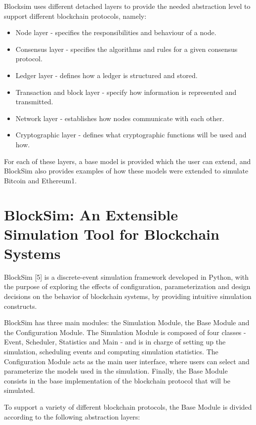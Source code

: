 Blocksim uses different detached layers to provide the needed abstraction level to support different blockchain protocols, namely:

\begin{itemize}
	\item Node layer - specifies the responsibilities and behaviour of a node.
	\item Consensus layer - specifies the algorithms and rules for a given consensus protocol.
	\item Ledger layer - defines how a ledger is structured and stored.
	\item Transaction and block layer - specify how information is represented and transmitted.
	\item Network layer - establishes how nodes communicate with each other.
	\item Cryptographic layer - defines what cryptographic functions will be used and how.
\end{itemize}

For each of these layers, a base model is provided which the user can extend, and BlockSim also provides examples of how these models were extended to simulate Bitcoin and Ethereum1.


\section{BlockSim: An Extensible Simulation Tool for Blockchain Systems}
\label{sec:blocksim2}

BlockSim [5] is a discrete-event simulation framework developed in Python, with the purpose of exploring the effects of configuration, parameterization and design decisions on the behavior of blockchain systems, by providing intuitive simulation constructs.

BlockSim has three main modules: the Simulation Module, the Base Module and the Configuration Module. The Simulation Module is composed of four classes - Event, Scheduler, Statistics and Main - and is in charge of setting up the simulation, scheduling events and computing simulation statistics. The Configuration Module acts as the main user interface, where users can select and parameterize the models used in the simulation. Finally, the Base Module consists in the base implementation of the blockchain protocol that will be simulated.

To support a variety of different blockchain protocols, the Base Module is divided according to the following abstraction layers:

